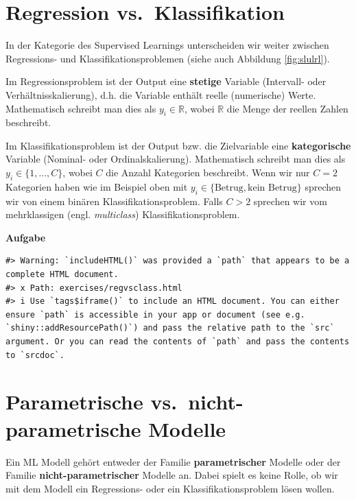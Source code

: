 \documentclass[
]{book}
\begin{document}
\hypertarget{regression-vs.-klassifikation}{%
\section{Regression vs.~Klassifikation}\label{regression-vs.-klassifikation}}

In der Kategorie des Supervised Learnings unterscheiden wir weiter zwischen Regressions- und Klassifikationsproblemen (siehe auch Abbildung \ref{fig:slulrl}).

Im Regressionsproblem ist der Output eine \textbf{stetige} Variable (Intervall- oder Verhältnisskalierung), d.h. die Variable enthält reelle (numerische) Werte. Mathematisch schreibt man dies als \(y_i \in \mathbb{R}\), wobei \(\mathbb{R}\) die Menge der reellen Zahlen beschreibt.

Im Klassifikationsproblem ist der Output bzw. die Zielvariable eine \textbf{kategorische} Variable (Nominal- oder Ordinalskalierung). Mathematisch schreibt man dies als \(y_i \in \{1, \dots, C\}\), wobei \(C\) die Anzahl Kategorien beschreibt. Wenn wir nur \(C=2\) Kategorien haben wie im Beispiel oben mit \(y_i \in \{\text{Betrug}, \text{kein Betrug}\}\) sprechen wir von einem binären Klassifikationsproblem. Falls \(C>2\) sprechen wir vom mehrklassigen (engl. \emph{multiclass}) Klassifikationsproblem.

\textbf{Aufgabe}

\begin{verbatim}
#> Warning: `includeHTML()` was provided a `path` that appears to be a complete HTML document.
#> x Path: exercises/regvsclass.html
#> i Use `tags$iframe()` to include an HTML document. You can either ensure `path` is accessible in your app or document (see e.g. `shiny::addResourcePath()`) and pass the relative path to the `src` argument. Or you can read the contents of `path` and pass the contents to `srcdoc`.
\end{verbatim}

\hypertarget{parametrische-vs.-nicht-parametrische-modelle}{%
\section{Parametrische vs.~nicht-parametrische Modelle}\label{parametrische-vs.-nicht-parametrische-modelle}}

Ein ML Modell gehört entweder der Familie \textbf{parametrischer} Modelle oder der Familie \textbf{nicht-parametrischer} Modelle an. Dabei spielt es keine Rolle, ob wir mit dem Modell ein Regressions- oder ein Klassifikationsproblem lösen wollen.
\end{document}

